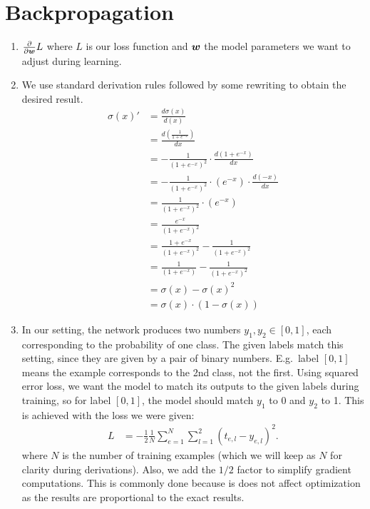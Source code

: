 \documentclass[11pt,a4paper]{article}
\begin{document}
\section{Backpropagation}
\begin{enumerate}[label=(\alph*)]
    \item $\frac{\partial}{\partial{\boldsymbol{w}}}L$ where $L$ is our loss function and
          ${\boldsymbol{w}}$ the model parameters we want to adjust during learning.
    \item We use standard derivation rules followed by some rewriting to obtain
          the desired result.
          \begin{align*}
              \sigma(x)' & = \frac{d\sigma(x)}{d(x)}                                      \\
                         & = \frac{d(\frac{1}{1+e^{-x}})}{dx}                             \\
                         & = -\frac{1}{(1+e^{-x})^2}\cdot \frac{d(1+e^{-x})}{dx}          \\
                         & = -\frac{1}{(1+e^{-x})^2}\cdot (e^{-x}) \cdot \frac{d(-x)}{dx} \\
                         & = \frac{1}{(1+e^{-x})^2}\cdot (e^{-x})                         \\
                         & = \frac{e^{-x}}{(1+e^{-x})^2}                                  \\
                         & = \frac{1+e^{-x}}{(1+e^{-x})^2} - \frac{1}{(1+e^{-x})^2}       \\
                         & = \frac{1}{(1+e^{-x})} - \frac{1}{(1+e^{-x})^2}                \\
                         & = \sigma(x)-\sigma(x)^2                                        \\
                         & = \sigma(x)\cdot (1-\sigma(x))
          \end{align*}
    \item In our setting, the network produces two numbers $y_1,y_2\in [0,1]$,
          each corresponding to the probability of one class.
          The given labels match this setting, since they are given by a pair of
          binary numbers. E.g.\ label $[0,1]$ means the example corresponds to
          the 2nd class, not the first.
          Using squared error loss, we want the model to match its outputs to
          the given labels during training, so for label $[0,1]$, the model
          should match $y_1$ to 0 and $y_2$ to 1.
          This is achieved with the loss we were given:
          \begin{align*}
              L & = -\frac{1}{2}\frac{1}{N}\sum_{e=1}^{N} \sum_{l=1}^{2} (t_{e,l}-y_{e,l})^2.
          \end{align*}
          where $N$ is the number of training examples (which we will keep as
          $N$ for clarity during derivations).
          Also, we add the $1/2$ factor to simplify gradient computations.
          This is commonly done because is does not affect optimization as the
          results are proportional to the exact results. \\


\end{enumerate}
\end{document}
